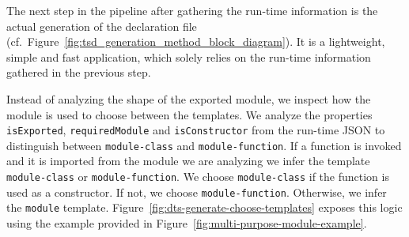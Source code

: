 \documentclass[english,cleveref,autoref,submission]{programming}
\newcommand{\figref}[1]{Figure~\ref{#1}}
\begin{document}
The next step in the pipeline after gathering the run-time information is
the actual generation of the declaration file (cf.\
\figref{fig:tsd_generation_method_block_diagram}). It is a lightweight,
simple and fast application, which solely relies on the run-time
information gathered in the previous step.

Instead of analyzing the shape of the exported module, we inspect how the module is used to choose between the templates. We analyze the properties \texttt{isExported}, \texttt{requiredModule} and \texttt{isConstructor} from the run-time JSON to distinguish between \texttt{module-class} and \texttt{module-function}. If a function is invoked and it is imported from the module we are analyzing we infer the template \texttt{module-class} or \texttt{module-function}. We choose \texttt{module-class} if the function is used as a constructor. If not, we choose \texttt{module-function}. Otherwise, we infer the \texttt{module} template. \figref{fig:dts-generate-choose-templates} exposes this logic using the example provided in \figref{fig:multi-purpose-module-example}.
\end{document}
